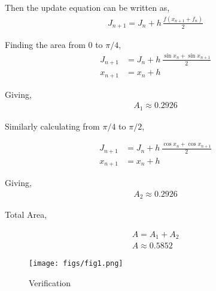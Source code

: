 \documentclass[journal]{IEEEtran}
\begin{document}
    Then the update equation can be written as,
    \begin{align}
        J_{n+1} = J_n + h \,\frac{f(x_{n+1}+f_n)}{2}
    \end{align}
    
    Finding the area from 0 to $\pi/4$,
    \begin{align}
        J_{n+1} &= J_n + h\, \frac{\sin{x_n} + {\sin{x_{n+1}}}}{2}\\
        x_{n+1} &= x_n + h
    \end{align}

    Giving,
    \begin{align}
        A_1 \approx 0.2926
    \end{align}

    Similarly calculating from $\pi/4$ to $\pi/2$,

    \begin{align}
        J_{n+1} &= J_n + h\, \frac{\cos{x_n} + {\cos{x_{n+1}}}}{2}\\
        x_{n+1} &= x_n + h
    \end{align}

    Giving,
    \begin{align}
        A_2 \approx 0.2926
    \end{align}

    Total Area,

    
    \begin{align}
        A = A_1 + A_2\\
        A \approx 0.5852
    \end{align}


    \begin{figure}[ht]  
        \centering  
        \texttt{[image: figs/fig1.png]}  
        \caption{Verification}
    \end{figure}
\end{document}

